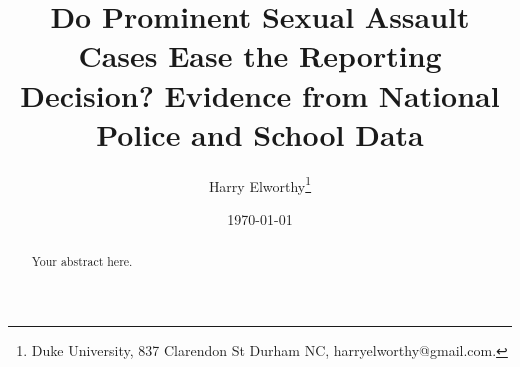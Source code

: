 \documentclass[AER]{AEA}
\begin{document}
\title{Do Prominent Sexual Assault Cases Ease the Reporting Decision? Evidence from National Police and School Data}
\author{Harry Elworthy\thanks{Duke University, 837 Clarendon St Durham NC, harryelworthy@gmail.com.}}
\date{\today}
\pubMonth{}
\pubYear{}
\pubVolume{}
\pubIssue{}
\JEL{}
\Keywords{}

\begin{abstract}
Your abstract here.
\end{abstract}


\maketitle










\end{document}
